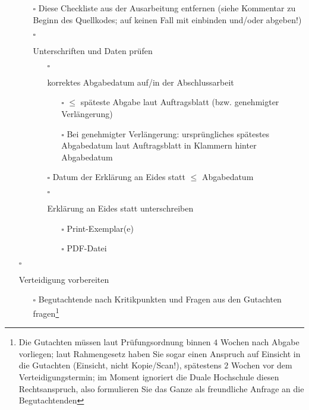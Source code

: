 \begin{itemize}
{\begin{itemize}
{\begin{itemize}
                \end{itemize}
            }
            \item[$\square$]{\color{red}
                Diese Checkliste aus der Ausarbeitung entfernen (siehe Kommentar zu Beginn des Quellkodes; auf keinen Fall mit einbinden und/oder abgeben!)
            }
            \item[$\square$]{
                Unterschriften und Daten prüfen
                \begin{itemize}
                    \item[$\square$]{
                        korrektes Abgabedatum auf/in der Abschlussarbeit
                        \begin{itemize}
                            \item[$\square$] $\leq$ späteste Abgabe laut Auftragsblatt (bzw. genehmigter Verlängerung)
                            \item[$\square$] Bei genehmigter Verlängerung: ursprüngliches spätestes Abgabedatum laut Auftragsblatt in Klammern hinter Abgabedatum
                        \end{itemize}
                    }
                    \item[$\square$] Datum der Erklärung an Eides statt $\leq$ Abgabedatum
                    \item[$\square$]{
                        Erklärung an Eides statt unterschreiben
                        \begin{itemize}
                            \item[$\square$] Print-Exemplar(e)
                            \item[$\square$] PDF-Datei
                        \end{itemize}
                    }
                \end{itemize}
            }
        \end{itemize}
    }
    \item[$\square$]{
        Verteidigung vorbereiten
        \begin{itemize}
            \item[$\square$]{
                Begutachtende nach Kritikpunkten und Fragen aus den Gutachten fragen\footnote{Die Gutachten müssen laut Prüfungsordnung binnen $4$ Wochen nach Abgabe vorliegen; laut Rahmengesetz haben Sie sogar einen Anspruch auf Einsicht in die Gutachten (Einsicht, nicht Kopie/Scan!), spätestens $2$ Wochen vor dem Verteidigungstermin; im Moment ignoriert die Duale Hochschule diesen Rechtsanspruch, also formulieren Sie das Ganze als freundliche Anfrage an die Begutachtenden}
}
\end{itemize}}
\end{itemize}
